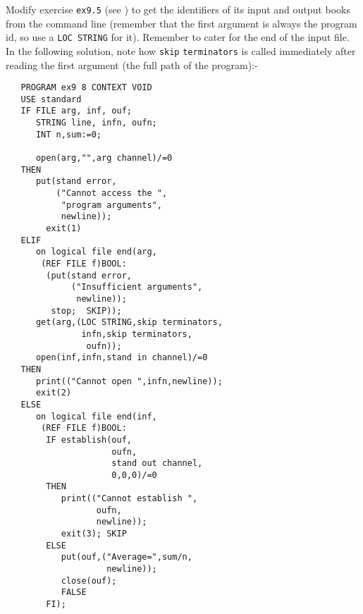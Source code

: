 \begin{exercise}
\item Modify exercise \verb|ex9.5| (see ) to
get the identifiers of its input and output books from the command
line (remember that the first argument is always the program id, so
use a \verb|LOC STRING| for it).  Remember to cater for the end of
the input file. \ans In the following solution, note how
\texttt{skip} \texttt{term\-in\-ators} is called immediately after
reading the first argument (the full path of the program):-
\begin{verbatim}
   PROGRAM ex9 8 CONTEXT VOID
   USE standard
   IF FILE arg, inf, ouf;
      STRING line, infn, oufn;
      INT n,sum:=0;

      open(arg,"",arg channel)/=0
   THEN
      put(stand error,
          ("Cannot access the ",
           "program arguments",
           newline));
        exit(1)
   ELIF
      on logical file end(arg,
       (REF FILE f)BOOL:
        (put(stand error,
             ("Insufficient arguments",
              newline));
         stop;  SKIP));
      get(arg,(LOC STRING,skip terminators,
               infn,skip terminators,
                oufn));
      open(inf,infn,stand in channel)/=0
   THEN
      print(("Cannot open ",infn,newline));
      exit(2)
   ELSE
      on logical file end(inf,
       (REF FILE f)BOOL:
        IF establish(ouf,
                     oufn,
                     stand out channel,
                     0,0,0)/=0
        THEN
           print(("Cannot establish ",
                  oufn,
                  newline));
           exit(3); SKIP
        ELSE
           put(ouf,("Average=",sum/n,
                    newline));
           close(ouf);
           FALSE
        FI);


\end{verbatim}
\end{exercise}
